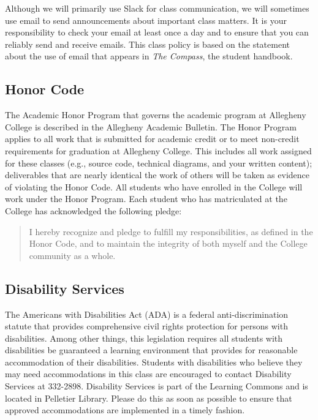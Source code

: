 Although we will primarily use Slack for class communication, we will sometimes use email to send announcements about
important class matters. It is your responsibility to check your email at least once a day and to ensure that you can
reliably send and receive emails. This class policy is based on the statement about the use of email that appears in
{\em The Compass}, the student handbook.

\vspace*{-.15in}
\subsection*{Honor Code}
\vspace*{-.05in}

The Academic Honor Program that governs the academic program at Allegheny College is described in the Allegheny
Academic Bulletin.  The Honor Program applies to all work that is submitted for academic credit or to meet non-credit
requirements for graduation at Allegheny College.  This includes all work assigned for these classes (e.g., source code,
technical diagrams, and your written content); deliverables that are nearly identical the work of others will be taken
as evidence of violating the Honor Code. All students who have enrolled in the College will work under the Honor
Program.  Each student who has matriculated at the College has acknowledged the following pledge:

\vspace*{-.1in}
\begin{quote}
I hereby recognize and pledge to fulfill my responsibilities, as defined in the Honor Code, and to maintain the
integrity of both myself and the College community as a whole.
\end{quote}
\vspace*{-.3in}

\subsection*{Disability Services}
\vspace*{-.05in}

The Americans with Disabilities Act (ADA) is a federal anti-discrimination statute that provides comprehensive civil
rights protection for persons with disabilities.  Among other things, this legislation requires all students with
disabilities be guaranteed a learning environment that provides for reasonable accommodation of their disabilities.
Students with disabilities who believe they may need accommodations in this class are encouraged to contact Disability
Services at 332-2898.  Disability Services is part of the Learning Commons and is located in Pelletier Library.
Please do this as soon as possible to ensure that approved accommodations are implemented in a timely fashion.

